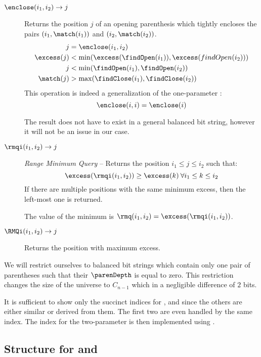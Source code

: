 \begin{description}
	\item[$\enclose(i_1, i_2) \rightarrow j$]
	Returns the position $j$ of an opening parenthesis which tightly encloses the pairs $(i_1, \match(i_1))$ and $(i_2, \match(i_2))$.
	\begin{align*}
		j &= \enclose(i_1, i_2) \\
		\excess(j) &< \min(\excess(\findOpen(i_1)), \excess(findOpen(i_2))) \\
		j &< \min(\findOpen(i_1), \findOpen(i_2)) \\
		\match(j) &> \max(\findClose(i_1), \findClose(i_2))
	\end{align*}
	This operation is indeed a generalization of the one-parameter \enclose{}:
	$$\enclose(i, i) = \enclose(i)$$
	
	The result does not have to exist in a general balanced bit string, however it will not be an issue in our case.
	
	\item[$\rmqi(i_1, i_2) \rightarrow j$]
	\emph{Range Minimum Query} -- Returns the position $i_1 \le j \le i_2$ such that: 
	$$\excess(\rmqi(i_1, i_2)) \ge \excess(k) \:\forall i_1 \le k \le i_2$$
	If there are multiple positions with the same minimum excess, then the left-most one is returned.
	
	The value of the minimum is $\rmq(i_1, i_2) = \excess(\rmqi(i_1, i_2))$.
	
	\item[$\RMQi(i_1, i_2) \rightarrow j$]
	Returns the position with maximum excess.
\end{description}

We will restrict ourselves to balanced bit strings which contain only one pair of parentheses such that their $\parenDepth$ is equal to zero.
This restriction changes the size of the universe to $C_{n-1}$ which in a negligible difference of $2$ bits.

\bigbreak

It is sufficient to show only the succinct indices for \findClose{}, \enclose{} and \rmqi{} since the others are either similar or derived from them.
The first two are even handled by the same index.
The index for the two-parameter \enclose{} is then implemented using \rmqi.

\subsection{Structure for \match{} and \enclose{}}\label{s:match-enclose}

